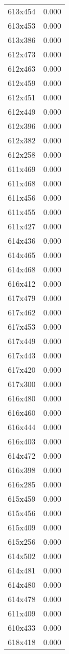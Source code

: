 \begin{table}
\begin{tabular}{lr}
613x454 & 0.000 \\
613x453 & 0.000 \\
613x386 & 0.000 \\
612x473 & 0.000 \\
612x463 & 0.000 \\
612x459 & 0.000 \\
612x451 & 0.000 \\
612x449 & 0.000 \\
612x396 & 0.000 \\
612x382 & 0.000 \\
612x258 & 0.000 \\
611x469 & 0.000 \\
611x468 & 0.000 \\
611x456 & 0.000 \\
611x455 & 0.000 \\
611x427 & 0.000 \\
614x436 & 0.000 \\
614x465 & 0.000 \\
614x468 & 0.000 \\
616x412 & 0.000 \\
617x479 & 0.000 \\
617x462 & 0.000 \\
617x453 & 0.000 \\
617x449 & 0.000 \\
617x443 & 0.000 \\
617x420 & 0.000 \\
617x300 & 0.000 \\
616x480 & 0.000 \\
616x460 & 0.000 \\
616x444 & 0.000 \\
616x403 & 0.000 \\
614x472 & 0.000 \\
616x398 & 0.000 \\
616x285 & 0.000 \\
615x459 & 0.000 \\
615x456 & 0.000 \\
615x409 & 0.000 \\
615x256 & 0.000 \\
614x502 & 0.000 \\
614x481 & 0.000 \\
614x480 & 0.000 \\
614x478 & 0.000 \\
611x409 & 0.000 \\
610x433 & 0.000 \\
618x418 & 0.000 \\

\end{tabular}
\end{table}
